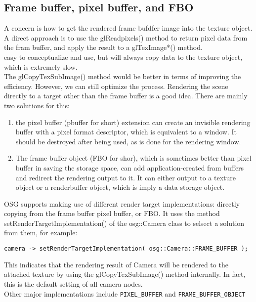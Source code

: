 \documentclass[a4paper,12pt]{book}
\begin{document}
\subsection{Frame buffer, pixel buffer, and FBO}
A concern is how to get the rendered frame bufdfer image into the texture object. A direct approach is to use the glReadpixels() method to return pixel data from the fram buffer, and apply the result to a glTexImage*() method.\\
\textrightarrow easy to conceptualize and use, but will always copy data to the texture object, which is extremely slow.\\

The glCopyTexSubImage() method would be better in terms of improving the efficiency. However, we can still optimize the process. Rendering the scene directly to a target other than the frame buffer is a good idea. There are mainly two solutions for this:
\begin{enumerate}
\item the pixel buffer (pbuffer for short) extension can create an invisible rendering buffer with a pixel format descriptor, which is equivalent to a window. It should be destroyed after being used, as is done for the rendering window.
\item The frame buffer object (FBO for shor), which is sometimes better than pixel buffer in saving the storage space, can add application-created fram buffers and redirect the rendering output to it. It can either output to a texture object or a renderbuffer object, which is imply a data storage object.
\end{enumerate}

OSG supports making use of different render target implementations: directly copying from the frame buffer pixel buffer, or FBO. It uses the method setRenderTargetImplementation() of the osg::Camera class to selsect a solution from them, for example:

\begin{lstlisting}
camera -> setRenderTargetImplementation( osg::Camera::FRAME_BUFFER );
\end{lstlisting}

This indicates that the rendering result of Camera will be rendered to the attached texture by using the glCopyTexSubImage() method internally. In fact, this is the default setting of all camera nodes.\\
Other major implementations include \verb|PIXEL_BUFFER| and \verb|FRAME_BUFFER_OBJECT|
\end{document}
